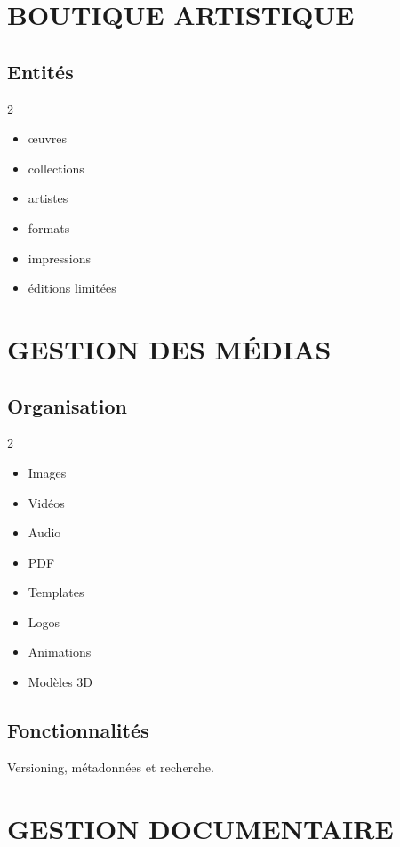 \documentclass[12pt,a4paper,oneside]{book}
\begin{document}
\chapter{BOUTIQUE ARTISTIQUE}

\section{Entités}
\begin{multicols}{2}
\begin{itemize}
\item œuvres
\item collections
\item artistes
\item formats
\item impressions
\item éditions limitées
\end{itemize}
\end{multicols}

\chapter{GESTION DES MÉDIAS}

\section{Organisation}
\begin{multicols}{2}
\begin{itemize}
\item Images
\item Vidéos
\item Audio
\item PDF
\item Templates
\item Logos
\item Animations
\item Modèles 3D
\end{itemize}
\end{multicols}

\section{Fonctionnalités}
Versioning, métadonnées et recherche.

\chapter{GESTION DOCUMENTAIRE}
\end{document}
